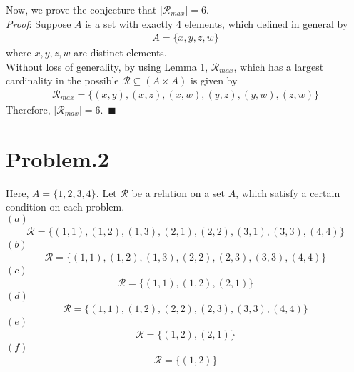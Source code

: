 \documentclass[12pt]{article}
\begin{document}
Now, we prove the conjecture that $|\mathcal{R}_{max}| = 6$.\\[1em]
\underline{\textit{Proof}}:
Suppose $A$ is a set with exactly 4 elements, which defined in general by
\begin{gather*}
A = \{ x,y,z,w \}
\end{gather*}
where $x,y,z,w$ are distinct elements.\\
Without loss of generality, by using Lemma 1, $\mathcal{R}_{max}$, which has a largest cardinality in the possible $\mathcal{R} \subseteq  (A \times A)$ is given by
\begin{gather*}
\mathcal{R}_{max} = \{ (x,y), (x,z), (x,w), (y,z), (y,w), (z,w) \}
\end{gather*}
Therefore, $|\mathcal{R}_{max}| = 6$.~$\blacksquare$

\section*{Problem.2}
Here, $A = \{ 1,2,3,4 \}$. Let $\mathcal{R}$ be a relation on a set $A$, which satisfy a certain condition on each problem.\\[1em]
$(a)$\\
\begin{gather*}
\mathcal{R} = \{ (1,1),(1,2),(1,3),(2,1),(2,2),(3,1),(3,3),(4,4) \}
\end{gather*}
$(b)$\\
\begin{gather*}
\mathcal{R} = \{ (1,1),(1,2),(1,3),(2,2),(2,3),(3,3), (4,4) \}
\end{gather*}
$(c)$\\
\begin{gather*}
\mathcal{R} = \{ (1,1),(1,2),(2,1) \}
\end{gather*}
$(d)$\\
\begin{gather*}
\mathcal{R} = \{ (1,1),(1,2),(2,2),(2,3),(3,3), (4,4) \}
\end{gather*}
$(e)$\\
\begin{gather*}
\mathcal{R} = \{ (1,2),(2,1) \}
\end{gather*}
$(f)$\\
\begin{gather*}
\mathcal{R} = \{ (1,2) \}
\end{gather*}
\end{document}
